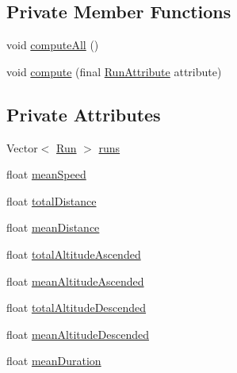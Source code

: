\subsection*{Private Member Functions}
\begin{DoxyCompactItemize}
\item 
void \mbox{\hyperlink{classcom_1_1activitytracker_1_1_run_stats_a85018dbaae7a08213d443a0697e59ee4}{compute\+All}} ()
\item 
void \mbox{\hyperlink{classcom_1_1activitytracker_1_1_run_stats_ac73cb94cc8ff604fe446d9a327e420cc}{compute}} (final \mbox{\hyperlink{enumcom_1_1activitytracker_1_1_run_attribute}{Run\+Attribute}} attribute)
\end{DoxyCompactItemize}
\subsection*{Private Attributes}
\begin{DoxyCompactItemize}
\item 
Vector$<$ \mbox{\hyperlink{classcom_1_1activitytracker_1_1_run}{Run}} $>$ \mbox{\hyperlink{classcom_1_1activitytracker_1_1_run_stats_a0fd429e9f463ddf4897c507c0e3c0a12}{runs}}
\item 
float \mbox{\hyperlink{classcom_1_1activitytracker_1_1_run_stats_a64b9e6daf2be19571b8ad401922762c2}{mean\+Speed}}
\item 
float \mbox{\hyperlink{classcom_1_1activitytracker_1_1_run_stats_a2e9486ea214a828e9f58489fd2b1a718}{total\+Distance}}
\item 
float \mbox{\hyperlink{classcom_1_1activitytracker_1_1_run_stats_afcc9ab47852b6df6b15e9a592fe6c5ed}{mean\+Distance}}
\item 
float \mbox{\hyperlink{classcom_1_1activitytracker_1_1_run_stats_a1108dd2b031415da72508a5172335dd4}{total\+Altitude\+Ascended}}
\item 
float \mbox{\hyperlink{classcom_1_1activitytracker_1_1_run_stats_aecbe62c15075fe9be1604333c355fab6}{mean\+Altitude\+Ascended}}
\item 
float \mbox{\hyperlink{classcom_1_1activitytracker_1_1_run_stats_ae511b3772f61773885d0178b215786d7}{total\+Altitude\+Descended}}
\item 
float \mbox{\hyperlink{classcom_1_1activitytracker_1_1_run_stats_a578eae64367a00c625f4685fe879fe7c}{mean\+Altitude\+Descended}}
\item 
float \mbox{\hyperlink{classcom_1_1activitytracker_1_1_run_stats_a8bf9f1577cffd26e6235695278bfcdb9}{mean\+Duration}}
\end{DoxyCompactItemize}


